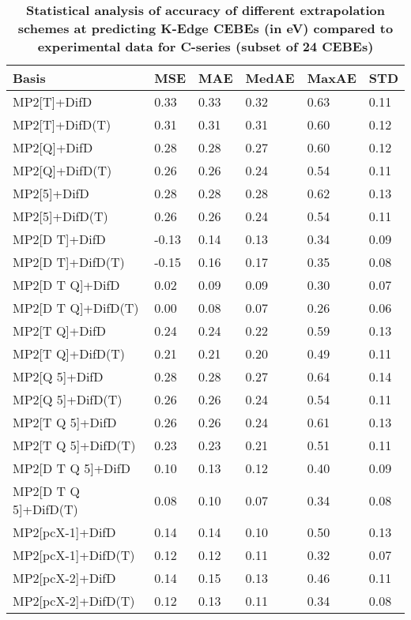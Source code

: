 \begin{table}
  \caption{\textbf{Statistical analysis of accuracy of different extrapolation schemes at predicting K-Edge CEBEs (in eV) compared to experimental data for C-series (subset of 24 CEBEs)}}
  \begin{tabular}{l l l l l l }
    \toprule
    \textbf{Basis} & \textbf{MSE} & \textbf{MAE} & \textbf{MedAE} & \textbf{MaxAE} & \textbf{STD} \\ 
    \midrule
    MP2[T]+DifD & 0.33 & 0.33 & 0.32 & 0.63 & 0.11 \\ 
    MP2[T]+DifD(T) & 0.31 & 0.31 & 0.31 & 0.60 & 0.12 \\ 
    MP2[Q]+DifD & 0.28 & 0.28 & 0.27 & 0.60 & 0.12 \\ 
    MP2[Q]+DifD(T) & 0.26 & 0.26 & 0.24 & 0.54 & 0.11 \\ 
    MP2[5]+DifD & 0.28 & 0.28 & 0.28 & 0.62 & 0.13 \\ 
    MP2[5]+DifD(T) & 0.26 & 0.26 & 0.24 & 0.54 & 0.11 \\ 
    MP2[D T]+DifD & -0.13 & 0.14 & 0.13 & 0.34 & 0.09 \\ 
    MP2[D T]+DifD(T) & -0.15 & 0.16 & 0.17 & 0.35 & 0.08 \\ 
    MP2[D T Q]+DifD & 0.02 & 0.09 & 0.09 & 0.30 & 0.07 \\ 
    MP2[D T Q]+DifD(T) & 0.00 & 0.08 & 0.07 & 0.26 & 0.06 \\ 
    MP2[T Q]+DifD & 0.24 & 0.24 & 0.22 & 0.59 & 0.13 \\ 
    MP2[T Q]+DifD(T) & 0.21 & 0.21 & 0.20 & 0.49 & 0.11 \\ 
    MP2[Q 5]+DifD & 0.28 & 0.28 & 0.27 & 0.64 & 0.14 \\ 
    MP2[Q 5]+DifD(T) & 0.26 & 0.26 & 0.24 & 0.54 & 0.11 \\ 
    MP2[T Q 5]+DifD & 0.26 & 0.26 & 0.24 & 0.61 & 0.13 \\ 
    MP2[T Q 5]+DifD(T) & 0.23 & 0.23 & 0.21 & 0.51 & 0.11 \\ 
    MP2[D T Q 5]+DifD & 0.10 & 0.13 & 0.12 & 0.40 & 0.09 \\ 
    MP2[D T Q 5]+DifD(T) & 0.08 & 0.10 & 0.07 & 0.34 & 0.08 \\ 
    MP2[pcX-1]+DifD & 0.14 & 0.14 & 0.10 & 0.50 & 0.13 \\ 
    MP2[pcX-1]+DifD(T) & 0.12 & 0.12 & 0.11 & 0.32 & 0.07 \\ 
    MP2[pcX-2]+DifD & 0.14 & 0.15 & 0.13 & 0.46 & 0.11 \\ 
    MP2[pcX-2]+DifD(T) & 0.12 & 0.13 & 0.11 & 0.34 & 0.08 \\ 

\end{tabular}
\end{table}
